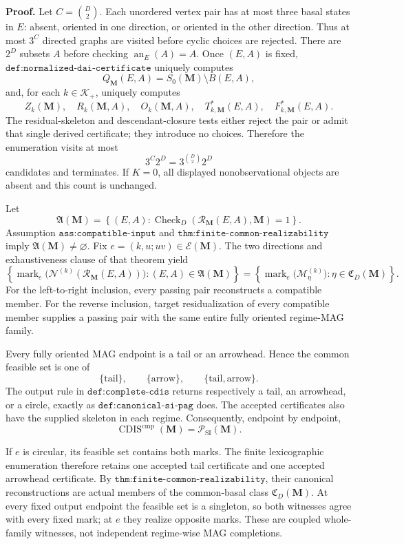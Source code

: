 \textbf{Proof.}
Let \(C=\binom D2\).  Each unordered vertex pair has at most three basal states in \(E\): absent, oriented in one direction, or oriented in the other direction.  Thus at most \(3^C\) directed graphs are visited before cyclic choices are rejected.  There are \(2^D\) subsets \(A\) before checking \(\operatorname{an}_E(A)=A\).  Once \((E,A)\) is fixed, \(\texttt{def:normalized-dai-certificate}\) uniquely computes
\[
Q_{\mathbf M}(E,A)=S_0(\mathbf M)\setminus B(E,A),
\]
and, for each \(k\in\mathcal K_+\), uniquely computes
\[
Z_k(\mathbf M),\quad R_k(\mathbf M,A),\quad O_k(\mathbf M,A),
\quad T^*_{k,\mathbf M}(E,A),\quad F^*_{k,\mathbf M}(E,A).
\]
The residual-skeleton and descendant-closure tests either reject the pair or admit that single derived certificate; they introduce no choices.  Therefore the enumeration visits at most
\[
3^C2^D=3^{\binom D2}2^D
\]
candidates and terminates.  If \(K=0\), all displayed nonobservational objects are absent and this count is unchanged.

Let
\[
\mathfrak A(\mathbf M)
=\left\{(E,A):
\operatorname{Check}_{D}(\mathcal R_{\mathbf M}(E,A),\mathbf M)=1
\right\}.
\]
Assumption \(\texttt{ass:compatible-input}\) and \(\texttt{thm:finite-common-realizability}\) imply \(\mathfrak A(\mathbf M)\ne\varnothing\).  Fix \(e=(k,u;uv)\in\mathcal E(\mathbf M)\).  The two directions and exhaustiveness clause of that theorem yield
\[
\left\{
\operatorname{mark}_e\bigl(\mathcal N^{(k)}(\mathcal R_{\mathbf M}(E,A))\bigr):
(E,A)\in\mathfrak A(\mathbf M)
\right\}
=
\left\{
\operatorname{mark}_e\bigl(\mathcal M_\eta^{(k)}\bigr):
\eta\in\mathfrak C_D(\mathbf M)
\right\}.
\]
For the left-to-right inclusion, every passing pair reconstructs a compatible member.  For the reverse inclusion, target residualization of every compatible member supplies a passing pair with the same entire fully oriented regime-MAG family.

Every fully oriented MAG endpoint is a tail or an arrowhead.  Hence the common feasible set is one of
\[
\{\mathrm{tail}\},
\qquad
\{\mathrm{arrow}\},
\qquad
\{\mathrm{tail},\mathrm{arrow}\}.
\]
The output rule in \(\texttt{def:complete-cdis}\) returns respectively a tail, an arrowhead, or a circle, exactly as \(\texttt{def:canonical-si-pag}\) does.  The accepted certificates also have the supplied skeleton in each regime.  Consequently, endpoint by endpoint,
\[
\operatorname{CDIS}^{\mathrm{cmp}}(\mathbf M)=\mathcal P_{\mathrm{SI}}(\mathbf M).
\]

If \(e\) is circular, its feasible set contains both marks.  The finite lexicographic enumeration therefore retains one accepted tail certificate and one accepted arrowhead certificate.  By \(\texttt{thm:finite-common-realizability}\), their canonical reconstructions are actual members of the common-basal class \(\mathfrak C_D(\mathbf M)\).  At every fixed output endpoint the feasible set is a singleton, so both witnesses agree with every fixed mark; at \(e\) they realize opposite marks.  These are coupled whole-family witnesses, not independent regime-wise MAG completions.

